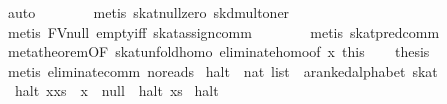\begin{isabellebody}
\ auto\isanewline
\ \ \ \ \ \ \isamarkupfalse%
\ {}metis\ skat{}null{}zero\ skd{}mult{}oner{}\isanewline
\ \ \ \ \ \ \isamarkupfalse%
\ {}metis\ FV{}null\ empty{}iff\ skat{}assign{}comm{}\isanewline
\ \ \ \ \ \ \isamarkupfalse%
\ {}metis\ skat{}pred{}comm{}\isanewline
\ \ \isamarkupfalse%
\isanewline
\ \ \isamarkupfalse%
\ metatheorem{}OF\ skat{}unfold{}homo\ eliminate{}homo{}of\ x{}\ this{}\isanewline
\ \ \isamarkupfalse%
\ {}thesis\isanewline
\ \ \ \ \isamarkupfalse%
\ {}metis\ eliminate{}comm\ no{}reads{}\isanewline
{}\isamarkupfalse%
%
\endisatagproof
{\isafoldproof}%
%
\isadelimproof
\isanewline
%
\endisadelimproof
\isanewline
{}\isamarkupfalse%
\ halt\ {}{}\ {}nat\ list\ {}\ {}a{}{}ranked{}alphabet\ skat{}\ \isanewline
\ \ {}halt\ {}x{}xs{}\ {}\ x\ {}{}\ null\ {}\ halt\ xs{}\isanewline
{}\ {}halt\ {}{}\ {}\ {}{}\isanewline

\end{isabellebody}
